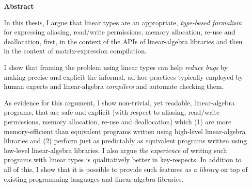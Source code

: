 \newpage
{\normalfont\Huge\sffamily\bfseries Abstract}
\vspace{24pt}

In this thesis, I argue that linear types are an appropriate, \emph{type-based
formalism} for expressing aliasing, read/write permissions, memory allocation,
re-use and deallocation, first, in the context of the APIs of linear-algebra
libraries and then in the context of matrix-expression compilation.

I show that framing the problem using linear types can help \emph{reduce bugs}
by making precise and explicit the informal, ad-hoc practices typically
employed by human experts and linear-algebra \emph{compilers} and automate
checking them.

As evidence for this argument, I show non-trivial, yet readable, linear-algebra
programs, that are safe and explicit (with respect to aliasing, read/write
permissions, memory allocation, re-use and deallocation) which (1) are more
memory-efficient than equivalent programs written using high-level
linear-algebra libraries and (2) perform just as predictably as equivalent
programs written using low-level linear-algebra libraries. I also argue
\emph{the experience} of writing such programs with linear types is
qualitatively better in key-respects. In addition to all of this, I show that
it is possible to provide such features \emph{as a library} on top of existing
programming languages and linear-algebra libraries.

\newpage
\vspace*{\fill}
